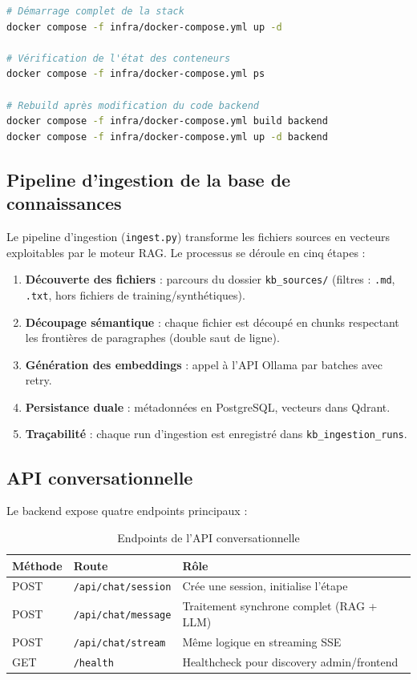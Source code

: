 \documentclass[12pt,a4paper]{report}
\begin{document}
\begin{lstlisting}[language=bash, caption={Démarrage de la stack Docker Compose}, label={lst:docker}]
# Démarrage complet de la stack
docker compose -f infra/docker-compose.yml up -d

# Vérification de l'état des conteneurs
docker compose -f infra/docker-compose.yml ps

# Rebuild après modification du code backend
docker compose -f infra/docker-compose.yml build backend
docker compose -f infra/docker-compose.yml up -d backend
\end{lstlisting}

\subsection{Pipeline d'ingestion de la base de connaissances}

Le pipeline d'ingestion (\texttt{ingest.py}) transforme les fichiers sources en vecteurs
exploitables par le moteur RAG. Le processus se déroule en cinq étapes :

\begin{enumerate}
  \item \textbf{Découverte des fichiers} : parcours du dossier \texttt{kb\_sources/}
  (filtres : \texttt{.md}, \texttt{.txt}, hors fichiers de training/synthétiques).
  \item \textbf{Découpage sémantique} : chaque fichier est découpé en chunks respectant
  les frontières de paragraphes (double saut de ligne).
  \item \textbf{Génération des embeddings} : appel à l'API Ollama par batches avec retry.
  \item \textbf{Persistance duale} : métadonnées en PostgreSQL, vecteurs dans Qdrant.
  \item \textbf{Traçabilité} : chaque run d'ingestion est enregistré dans
  \texttt{kb\_ingestion\_runs}.
\end{enumerate}

\subsection{API conversationnelle}

Le backend expose quatre endpoints principaux :

\begin{table}[H]
\centering
\caption{Endpoints de l'API conversationnelle}
\small
\begin{tabularx}{\textwidth}{|l|l|X|}
\hline
\rowcolor{tableheader}
\textbf{Méthode} & \textbf{Route} & \textbf{Rôle} \\
\hline
POST & \texttt{/api/chat/session} & Crée une session, initialise l'étape \\
\hline
POST & \texttt{/api/chat/message} & Traitement synchrone complet (RAG + LLM) \\
\hline
POST & \texttt{/api/chat/stream} & Même logique en streaming SSE \\
\hline
GET & \texttt{/health} & Healthcheck pour discovery admin/frontend \\
\hline
\end{tabularx}
\label{tab:api}
\end{table}
\end{document}

